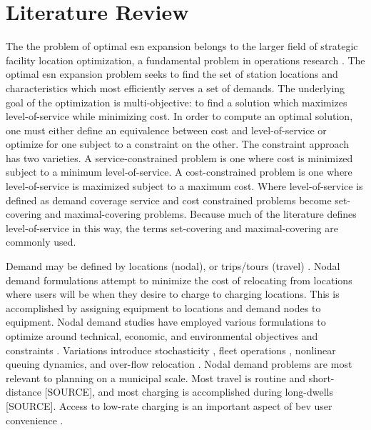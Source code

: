 \section{Literature Review}

The the problem of optimal \gls{esn} expansion belongs to the larger field of strategic facility location optimization, a fundamental problem in operations research \citep{Owen_1998}. The optimal \gls{esn} expansion problem seeks to find the set of station locations and characteristics which most efficiently serves a set of demands. The underlying goal of the optimization is multi-objective: to find a solution which maximizes level-of-service while minimizing cost. In order to compute an optimal solution, one must either define an equivalence between cost and level-of-service or optimize for one subject to a constraint on the other. The constraint approach has two varieties. A service-constrained problem is one where cost is minimized subject to a minimum level-of-service. A cost-constrained problem is one where level-of-service is maximized subject to a maximum cost. Where level-of-service is defined as demand coverage service and cost constrained problems become set-covering and maximal-covering problems. Because much of the literature defines level-of-service in this way, the terms set-covering and maximal-covering are commonly used.

Demand may be defined by locations (nodal), or trips/tours (travel) \citep{Metais_2022}. Nodal demand formulations attempt to minimize the cost of relocating from locations where users will be when they desire to charge to charging locations. This is accomplished by assigning equipment to locations and demand nodes to equipment. Nodal demand studies have employed various formulations \citep{Kuby_2023} to optimize around technical, economic, and environmental objectives and constraints \citep{Yuvaraj_2024, Faustino_2023, Gupta_2023}. Variations introduce stochasticity \citep{Tungom_2024, Wu_Fainman_2024}, fleet operations \citep{Davatgari_2024, Ma_Xie_2021}, nonlinear queuing \citep{Liu_2023} dynamics, and over-flow relocation \citep{Weekx_2024}. Nodal demand problems are most relevant to planning on a municipal scale. Most travel is routine and short-distance [SOURCE], and most charging is accomplished during long-dwells [SOURCE]. Access to low-rate charging is an important aspect of \gls{bev} user convenience \citep{Rabinowitz_2023}.

